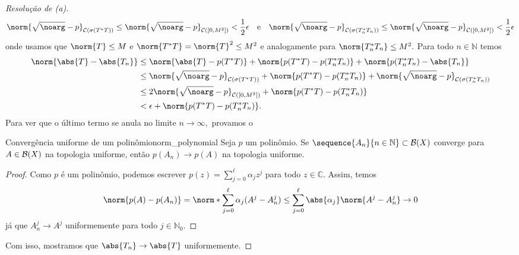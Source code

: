 \begin{proof}[Resolução de (a)]
  \begin{equation*}
    \norm{\sqrt{\noarg} - p}_{\mathcal{C}(\sigma(T^*T))} \leq \norm{\sqrt{\noarg} - p}_{\mathcal{C}([0,M^2])} < \frac12 \epsilon
      \quad\text{e}\quad
      \norm{\sqrt{\noarg} - p}_{\mathcal{C}(\sigma(T_n^*T_n))} \leq \norm{\sqrt{\noarg} - p}_{\mathcal{C}([0,M^2])} < \frac12 \epsilon
  \end{equation*}
  onde usamos que \(\norm{T} \leq M\) e \(\norm{T^*T} = \norm{T}^2 \leq M^2\) e analogamente para \(\norm{T_n^*T_n} \leq M^2.\) Para todo \(n \in \mathbb{N}\) temos
  \begin{align*}
    \norm{\abs{T} - \abs{T_n}} &\leq \norm{\abs{T} - p(T^*T)} + \norm{p(T^*T) - p(T_n^*T_n)} + \norm{p(T_n^*T_n) - \abs{T_n}}\\
                               &\leq \norm{\sqrt{\noarg} - p}_{\mathcal{C}(\sigma(T^*T))} + \norm{p(T^*T) - p(T_n^*T_n)}+ \norm{\sqrt{\noarg} -p}_{\mathcal{C}(\sigma(T_n^*T_n))}\\
                               &\leq 2\norm{\sqrt{\noarg} - p}_{\mathcal{C}([0,M^2])} + \norm{p(T^*T) - p(T_n^*T_n)}\\
                               &< \epsilon + \norm{p(T^*T) - p(T_n^*T_n)}.
  \end{align*}
  Para ver que o último termo se anula no limite \(n\to \infty,\) provamos o
  \begin{lemma}{Convergência uniforme de um polinômio}{norm_polynomial}
    Seja \(p\) um polinômio. Se \(\sequence{A_n}{n\in\mathbb{N}}\subset \bounded(X)\) converge para \(A \in \mathcal{B}(X)\) na topologia uniforme, então \(p(A_n) \to p(A)\) na topologia uniforme.
  \end{lemma}
  \begin{proof}
    Como \(p\) é um polinômio, podemos escrever \(p(z) = \sum_{j=0}^\ell{\alpha_j z^j}\) para todo \(z \in \mathbb{C}.\) Assim, temos
    \begin{equation*}
      \norm{p(A) - p(A_n)} = \norm*{\sum_{j = 0}^\ell{\alpha_j (A^j - A_n^j)}} \leq \sum_{j = 0}^\ell {\abs{\alpha_j} \norm{A^j - A_n^j}} \to 0
    \end{equation*}
    já que \(A_n^j \to A^j\) uniformemente para todo \(j \in \mathbb{N}_0.\)
  \end{proof}
  Com isso, mostramos que \(\abs{T_n} \to \abs{T}\) uniformemente.
\end{proof}
